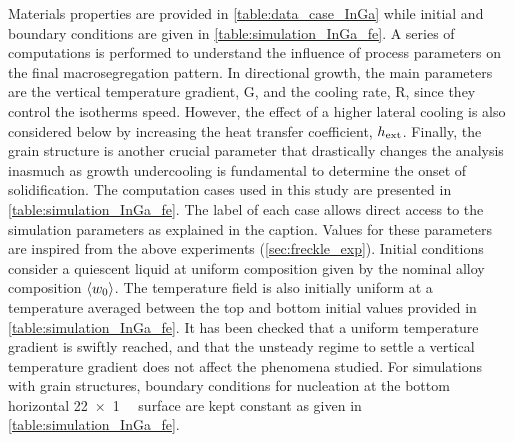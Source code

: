 Materials properties are provided in \cref{table:data_case_InGa} while initial and boundary conditions are given in \cref{table:simulation_InGa_fe}. 
A series of computations is performed to understand the influence of process parameters on the final macrosegregation pattern. 
In directional growth, the main parameters are the vertical temperature gradient, G, and the cooling rate, R, since they control the isotherms 
speed. However, the effect of a higher lateral cooling is also considered below by increasing the heat transfer coefficient,
$h_{\text{ext}}$. Finally, the grain structure is another crucial parameter that drastically changes the analysis inasmuch as growth 
undercooling is fundamental to determine the onset of solidification. The computation cases used in this study are presented 
in \cref{table:simulation_InGa_fe}. The label of each case allows direct access to the simulation parameters as explained in the caption. Values for 
these parameters are inspired from the above experiments (\cref{sec:freckle_exp}). Initial conditions consider a quiescent 
liquid at uniform composition given by the nominal alloy composition $\left \langle {w}_0 \right \rangle$. The temperature field is also initially uniform 
at a temperature averaged between the top and bottom initial values provided in \cref{table:simulation_InGa_fe}. It has been checked that a uniform 
temperature gradient is swiftly reached, and that the unsteady regime to settle a vertical temperature gradient does not affect 
the phenomena studied. For simulations with grain structures, boundary conditions for nucleation at the bottom horizontal \SI{22 x 1}{\milli \uarea} 
surface are kept constant as given in \cref{table:simulation_InGa_fe}.

